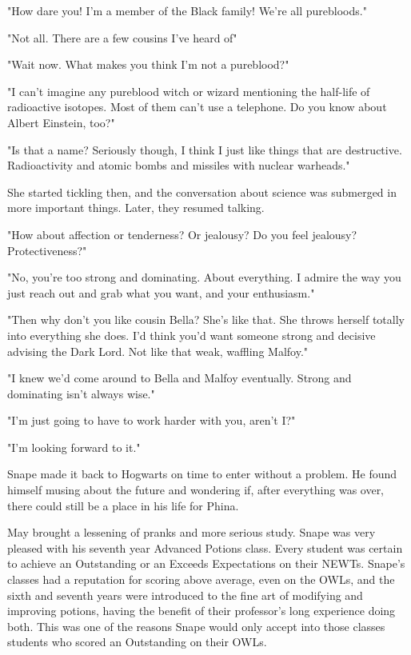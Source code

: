 "How dare you! I'm a member of the Black family! We're all purebloods."

"Not all. There are a few cousins I've heard of{\el}"

"Wait now. What makes you think I'm not a pureblood?"

"I can't imagine any pureblood witch or wizard mentioning the half-life of radioactive isotopes. Most of them can't use a telephone. Do you know about Albert Einstein, too?"

"Is that a name? Seriously though, I think I just like things that are destructive. Radioactivity and atomic bombs and missiles with nuclear warheads."

She started tickling then, and the conversation about science was submerged in more important things. Later, they resumed talking.

"How about affection or tenderness? Or jealousy? Do you feel jealousy? Protectiveness?"

"No, you're too strong and{\el} dominating. About everything. I admire the way you just reach out and grab what you want, and your enthusiasm."

"Then why don't you like cousin Bella? She's like that. She throws herself totally into everything she does. I'd think you'd want someone strong and decisive advising the Dark Lord. Not like that weak, waffling Malfoy."

"I knew we'd come around to Bella and Malfoy eventually. Strong and dominating isn't always wise."

"I'm just going to have to work harder with you, aren't I?"

"I'm looking forward to it."

Snape made it back to Hogwarts on time to enter without a problem. He found himself musing about the future and wondering if, after everything was over, there could still be a place in his life for Phina.

May brought a lessening of pranks and more serious study. Snape was very pleased with his seventh year Advanced Potions class. Every student was certain to achieve an Outstanding or an Exceeds Expectations on their NEWTs. Snape's classes had a reputation for scoring above average, even on the OWLs, and the sixth and seventh years were introduced to the fine art of modifying and improving potions, having the benefit of their professor's long experience doing both. This was one of the reasons Snape would only accept into those classes students who scored an Outstanding on their OWLs.

